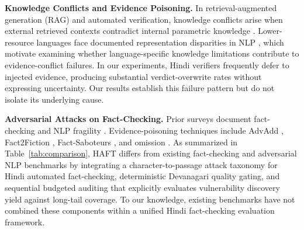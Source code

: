 \documentclass[11pt]{article}
\begin{document}
\textbf{Knowledge Conflicts and Evidence Poisoning.} In retrieval-augmented generation (RAG) and automated verification, knowledge conflicts arise when external retrieved contexts contradict internal parametric knowledge \citep{xie2024adaptive,wu2024clasheval,zou2025poisonedrag}. Lower-resource languages face documented representation disparities in NLP \citep{joshi2020state}, which motivate examining whether language-specific knowledge limitations contribute to evidence-conflict failures. In our experiments, Hindi verifiers frequently defer to injected evidence, producing substantial verdict-overwrite rates without expressing uncertainty. Our results establish this failure pattern but do not isolate its underlying cause.

\textbf{Adversarial Attacks on Fact-Checking.} Prior surveys document fact-checking and NLP fragility \citep{wang2021textflint,liu2025adversarial}. Evidence-poisoning techniques include AdvAdd \citep{du2022synthetic}, Fact2Fiction \citep{fact2fiction2026}, Fact-Saboteurs \citep{abdelnabi23usenix}, and omission \citep{atanasova2022fact}. As summarized in Table~\ref{tab:comparison}, HAFT differs from existing fact-checking and adversarial NLP benchmarks by integrating a character-to-passage attack taxonomy for Hindi automated fact-checking, deterministic Devanagari quality gating, and sequential budgeted auditing that explicitly evaluates vulnerability discovery yield against long-tail coverage. To our knowledge, existing benchmarks have not combined these components within a unified Hindi fact-checking evaluation framework.
\end{document}
